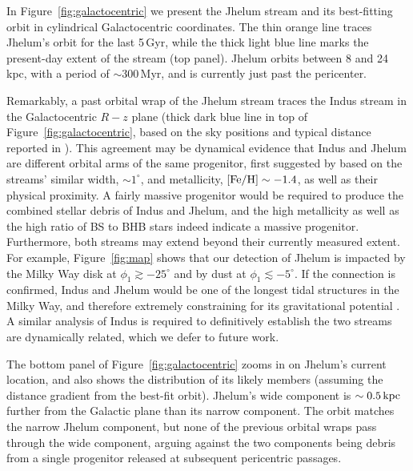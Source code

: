 \documentclass[twocolumn]{aastex62}
\newcommand{\apw}[1]{{\color{blue} APW: #1}}
\begin{document}
In Figure~\ref{fig:galactocentric} we present the Jhelum stream and its best-fitting orbit in cylindrical Galactocentric coordinates.
The thin orange line traces Jhelum's orbit for the last 5\,Gyr, while the thick light blue line marks the present-day extent of the stream (top panel).
Jhelum orbits between 8 and 24\,kpc, with a period of $\sim300$\,Myr, and is currently just past the pericenter.

Remarkably, a past orbital wrap of the Jhelum stream traces the Indus stream in the Galactocentric $R-z$ plane (thick dark blue line in top of Figure~\ref{fig:galactocentric}, based on the sky positions and typical distance reported in \citealt{shipp2018}).
This agreement may be dynamical evidence that Indus and Jhelum are different orbital arms of the same progenitor, first suggested by \citet{shipp2018} based on the streams' similar width, $\sim1^\circ$, and metallicity, $\rm[Fe/H]\sim-1.4$, as well as their physical proximity.
A fairly massive progenitor would be required to produce the combined stellar debris of Indus and Jhelum, and the high metallicity as well as the high ratio of BS to BHB stars indeed indicate a massive progenitor.
Furthermore, both streams may extend beyond their currently measured extent.
For example, Figure~\ref{fig:map} shows that our detection of Jhelum is impacted by the Milky Way disk at $\phi_1\gtrsim-25^\circ$ and by dust at $\phi_1\lesssim-5^\circ$.
If the connection is confirmed, Indus and Jhelum would be one of the longest tidal structures in the Milky Way, and therefore extremely constraining for its gravitational potential \citep{bh2018}.
A similar analysis of Indus is required to definitively establish the two streams are dynamically related, which we defer to future work.

The bottom panel of Figure~\ref{fig:galactocentric} zooms in on Jhelum's current location, and also shows the distribution of its likely members (assuming the distance gradient from the best-fit orbit).
Jhelum's wide component is $\sim0.5\,\rm kpc$ further from the Galactic plane than its narrow component.
The orbit matches the narrow Jhelum component, but none of the previous orbital wraps pass through the wide component, arguing against the two components being debris from a single progenitor released at subsequent pericentric passages.
\end{document}
